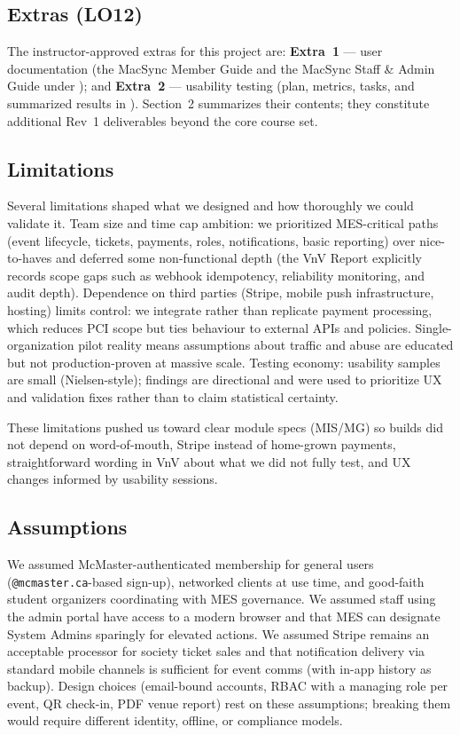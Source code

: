 \documentclass{article}
\begin{document}
\subsection{Extras (LO12)}

The instructor-approved extras for this project are: \textbf{Extra~1} --- user
documentation (the MacSync Member Guide and the MacSync Staff \& Admin Guide
under ); and \textbf{Extra~2} --- usability testing (plan,
metrics, tasks, and summarized results in
). Section~2 summarizes
their contents; they constitute additional Rev~1 deliverables beyond the core
course set.

\subsection{Limitations}

Several limitations shaped what we designed and how thoroughly we could validate
it. Team size and time cap ambition: we prioritized MES-critical paths
(event lifecycle, tickets, payments, roles, notifications, basic reporting) over
nice-to-haves and deferred some non-functional depth (the VnV Report explicitly
records scope gaps such as webhook idempotency, reliability monitoring, and audit
depth). Dependence on third parties (Stripe, mobile push infrastructure,
hosting) limits control: we integrate rather than replicate payment processing,
which reduces PCI scope but ties behaviour to external APIs and policies.
Single-organization pilot reality means assumptions about traffic and
abuse are educated but not production-proven at massive scale. Testing
economy: usability samples are small (Nielsen-style); findings are directional
and were used to prioritize UX and validation fixes rather than to claim
statistical certainty.

These limitations pushed us toward clear module specs (MIS/MG) so builds
did not depend on word-of-mouth, Stripe instead of home-grown payments,
straightforward wording in VnV about what we did not fully test, and
UX changes informed by usability sessions.

\subsection{Assumptions}

We assumed McMaster-authenticated membership for general users
(\texttt{@mcmaster.ca}-based sign-up), networked clients at use time,
and good-faith student organizers coordinating with MES governance.
We assumed staff using the admin portal have access to a modern browser
and that MES can designate System Admins sparingly for elevated actions.
We assumed Stripe remains an acceptable processor for society ticket
sales and that notification delivery via standard mobile channels is sufficient
for event comms (with in-app history as backup). Design choices (email-bound
accounts, RBAC with a managing role per event, QR check-in, PDF venue report)
rest on these assumptions; breaking them would require different identity,
offline, or compliance models.
\end{document}
